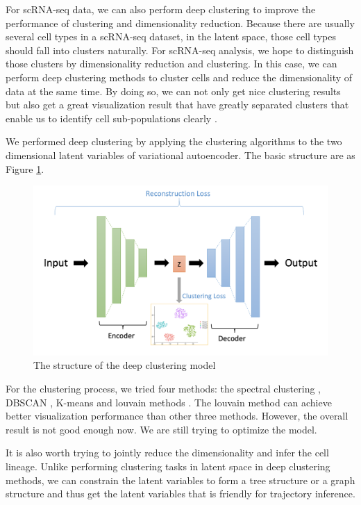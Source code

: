 For scRNA-seq data, we can also perform deep clustering to improve the performance of clustering and dimensionality reduction. Because there are usually several cell types in a scRNA-seq dataset, in the latent space, those cell types should fall into clusters naturally. For scRNA-seq analysis, we hope to distinguish those clusters by dimensionality reduction and clustering. In this case, we can perform deep clustering methods to cluster cells and reduce the dimensionality of data at the same time. By doing so, we can not only get nice clustering results but also get a great visualization result that have greatly separated clusters that enable us to identify cell sub-populations clearly \cite{tian2019clustering}. 

We performed deep clustering by applying the clustering algorithms to the two dimensional latent variables of variational autoencoder. The basic structure are as Figure \ref{dcstru}. 

\begin{figure}[htb!]
    \centering
    \includegraphics[width=1\textwidth]{figures/myfigures/dc.png}
    \caption{The structure of the deep clustering model}
    \label{dcstru}
\end{figure}

For the clustering process, we tried four methods: the spectral clustering \cite{von2007tutorial}, DBSCAN \cite{ester1996density}, K-means \cite{kanungo2002efficient} and louvain methods \cite{traag2019louvain}. The louvain method can achieve better visualization performance than other three methods. However, the overall result is not good enough now. We are still trying to optimize the model.

It is also worth trying to jointly reduce the dimensionality and infer the cell lineage. Unlike performing clustering tasks in latent space in deep clustering methods, we can constrain the latent variables to form a tree structure or a graph structure and thus get the latent variables that is friendly for trajectory inference.

